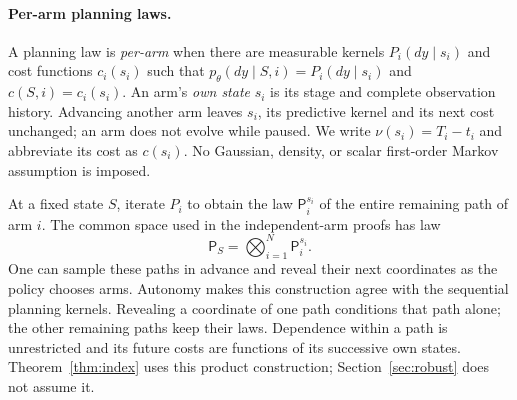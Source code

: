 \paragraph{Per-arm planning laws.}
A planning law is \emph{per-arm} when there are measurable kernels $P_i(dy\mid s_i)$ and
cost functions $c_i(s_i)$ such that $p_\theta(dy\mid S,i)=P_i(dy\mid s_i)$ and
$c(S,i)=c_i(s_i)$. An arm's \emph{own state} $s_i$ is its stage and complete observation
history. Advancing another arm leaves $s_i$, its predictive kernel and its next cost unchanged;
an arm does not evolve while paused. We write $\nu(s_i)=T_i-t_i$ and abbreviate its cost as
$c(s_i)$. No Gaussian, density, or scalar first-order Markov assumption is imposed.

At a fixed state $S$, iterate $P_i$ to obtain the law $\mathsf P_i^{s_i}$ of the entire
remaining path of arm $i$. The common space used in the independent-arm proofs has law
\[
\mathsf P_S=\bigotimes_{i=1}^N\mathsf P_i^{s_i}.
\]
One can sample these paths in advance and reveal their next coordinates as the policy chooses
arms. Autonomy makes this construction agree with the sequential planning kernels. Revealing a
coordinate of one path conditions that path alone; the other remaining paths keep their laws.
Dependence within a path is unrestricted and its future costs are functions of its successive
own states. Theorem~\ref{thm:index} uses this product construction; Section~\ref{sec:robust}
does not assume it.


